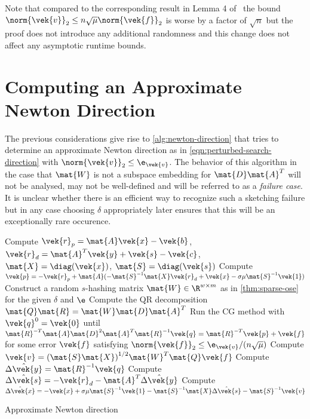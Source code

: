 Note that compared to the corresponding result in Lemma 4 of~\cite{Avron-FasterRandomizedInfeasibleIPMs} the bound \(\norm{\vek{v}}_2 \leq n \sqrt{\mu} \norm{\vek{f}}_2\) is worse by a factor of \(\sqrt{n}\) but the proof does not introduce any additional randomness and this change does not affect any asymptotic runtime bounds.

\section{Computing an Approximate Newton Direction}\label{sec:sketching-approximate-newton}

The previous considerations give rise to \cref{alg:newton-direction} that tries to determine an approximate Newton direction as in \cref{eqn:perturbed-search-direction} with \(\norm{\vek{v}}_2 \leq \e_{\vek{v}}\).
The behavior of this algorithm in the case that \(\mat{W}\) is not a subspace embedding for \(\mat{D}\mat{A}^T\) will not be analysed, may not be well-defined and will be referred to as a \emph{failure case}.
It is unclear whether there is an efficient way to recognize such a sketching failure but in any case choosing \(\delta\) appropriately later ensures that this will be an exceptionally rare occurence.

\begin{algorithm}
  Compute \(\vek{r}_p = \mat{A}\vek{x} - \vek{b}\), \(\vek{r}_d = \mat{A}^T \vek{y} + \vek{s} - \vek{c}\), \(\mat{X} = \diag(\vek{x})\), \(\mat{S} = \diag(\vek{s})\)\;\label{line:compute-residuals}
  Compute \(\vek{p} = -\vek{r}_p + \mat{A}(-\mat{S}^{-1}\mat{X}\vek{r}_d + \vek{x} - \sigma \mu \mat{S}^{-1} \vek{1})\)\;\label{line:compute-p}
  Construct a random \(s\)-hashing matrix \(\mat{W} \in \R^{w \times m}\) as in \cref{thm:sparse-ose} for the given \(\delta\) and \(\e\)\;\label{line:draw-sketching-matrix}
  Compute the QR decomposition \(\mat{Q} \mat{R} = \mat{W} \mat{D} \mat{A}^T\)\;\label{line:compute-qr}
  Run the CG method with \(\vek{q}^0 = \vek{0}\) until \(\mat{R}^{-T} \mat{A} \mat{D}^2 \mat{A}^T \mat{R}^{-1} \vek{q} = \mat{R}^{-T} \vek{p} + \vek{f}\) for some error \(\vek{f}\) satisfying \(\norm{\vek{f}}_2 \leq \e_{\vek{v}}/(n \sqrt{\mu})\)\;\label{line:cg}
  Compute \(\vek{v} = {(\mat{S} \mat{X})}^{1/2} \mat{W}^T \mat{Q} \vek{f}\)\;\label{line:compute-v}
  Compute \(\hat{\Delta\vek{y}} = \mat{R}^{-1}\vek{q}\)\;\label{line:compute-delta-y}
  Compute \(\hat{\Delta\vek{s}} = -\vek{r}_d - \mat{A}^T \hat{\Delta\vek{y}}\)\;\label{line:compute-delta-s}
  Compute \(\hat{\Delta\vek{x}} = -\vek{x} + \sigma \mu \mat{S}^{-1} \vek{1} - \mat{S}^{-1}\mat{X} \hat{\Delta\vek{s}} - \mat{S}^{-1} \vek{v}\)\;\label{line:compute-delta-x}
  \;
  \caption{Approximate Newton direction}\label{alg:newton-direction}
\end{algorithm}

